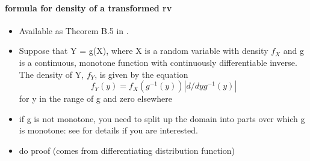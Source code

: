 \paragraph{formula for density of a transformed rv}

\begin{itemize}
\item Available as Theorem B.5 in \citet{Gre12}.
\item Suppose that Y = g(X), where X is a random variable with density
        $f_X$ and g is a continuous, monotone function with continuously
        differentiable inverse.  The
        density of Y, $f_Y$, is given by the equation
        \[ f_Y(y) = f_X(g^{-1}(y)) | d/dy g^{-1}(y) | \]
        for y in the range of g and zero elsewhere
\item if g is not monotone, you need to split up the domain into parts
        over which g is monotone: see \citet{CB02} for details if
        you are interested.
\item do proof (comes from differentiating distribution function)
\end{itemize}

